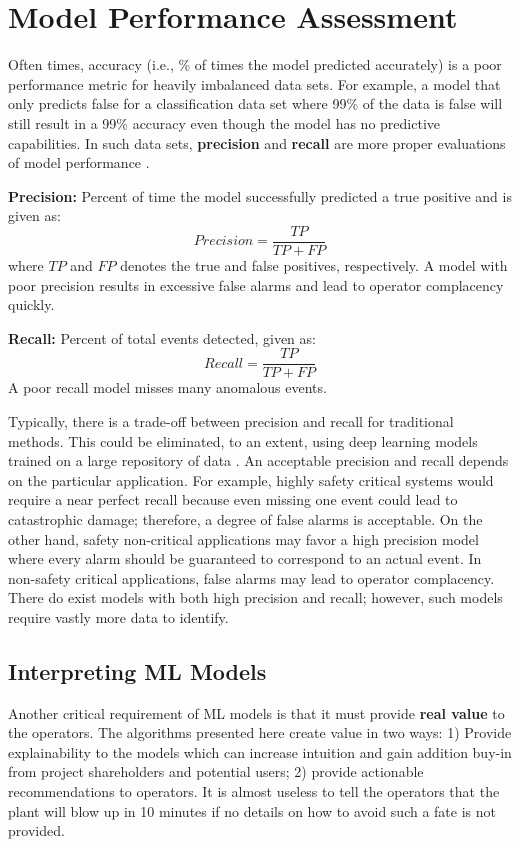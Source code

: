 \section{Model Performance Assessment}
Often times, accuracy (i.e., \% of times the model predicted accurately) is a poor performance metric for heavily imbalanced data sets.  For example, a model that only predicts false for a classification data set where 99\% of the data is false will still result in a 99\% accuracy even though the model has no predictive capabilities. In such data sets, \textbf{precision} and \textbf{recall} are more proper evaluations of model performance \cite{prec_recall}.

\textbf{Precision:} Percent of time the model successfully predicted a true positive and is given as:
\begin{equation}
    Precision = \frac{TP}{TP + FP}
\end{equation}
where $TP$ and $FP$ denotes the true and false positives, respectively. A model with poor precision results in excessive false alarms and lead to operator complacency quickly.  

\textbf{Recall:} Percent of total events detected, given as:
\begin{equation}
    Recall = \frac{TP}{TP + FP}
\end{equation}
A poor recall model misses many anomalous events.

Typically, there is a trade-off between precision and recall for traditional methods. This could be eliminated, to an extent, using deep learning models trained on a large repository of data \cite{deeplearning_course}.  An acceptable precision and recall depends on the particular application.  For example, highly safety critical systems would require a near perfect recall because even missing one event could lead to catastrophic damage; therefore, a degree of false alarms is acceptable.  On the other hand, safety non-critical applications may favor a high precision model where every alarm should be guaranteed to correspond to an actual event. In non-safety critical applications, false alarms may lead to operator complacency. There do exist models with both high precision and recall; however, such models require vastly more data to identify.



\subsection{Interpreting ML Models}
Another critical requirement of ML models is that it must provide \textbf{real value} to the operators.  The algorithms presented here create value in two ways: 1) Provide explainability to the models which can increase intuition and gain addition buy-in from project shareholders and potential users; 2) provide actionable recommendations to operators.  It is almost useless to tell the operators that the plant will blow up in 10 minutes if no details on how to avoid such a fate is not provided.

